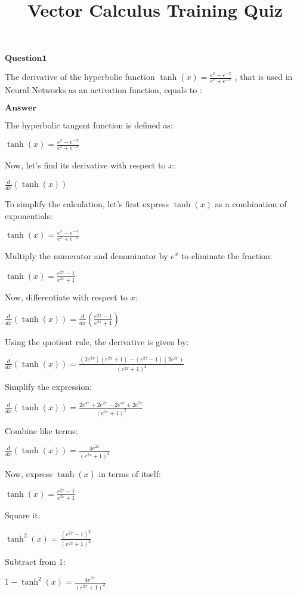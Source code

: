 \documentclass[11pt]{article}
\title{Vector Calculus Training Quiz}
\begin{document}
    
    \maketitle
    
    

    
    $\textbf{Question1}$

The derivative of the hyperbolic function
$\tanh(x) = \frac{e^{x}-e^{-x}}{e^{x}+e^{-x}}$ , that is used in
Neural Networks as an activation function, equals to :

$\textbf{Answer}$

    The hyperbolic tangent function is defined as:

$ \tanh(x) = \frac{e^{x} - e^{-x}}{e^{x} + e^{-x}} $

Now, let's find its derivative with respect to $x$:

$ \frac{d}{dx}(\tanh(x)) $

To simplify the calculation, let's first express $\tanh(x)$ as a
combination of exponentials:

$ \tanh(x) = \frac{e^{x} - e^{-x}}{e^{x} + e^{-x}} $

Multiply the numerator and denominator by $e^x$ to eliminate the
fraction:

$ \tanh(x) = \frac{e^{2x} - 1}{e^{2x} + 1} $

Now, differentiate with respect to $x$:

$ \frac{d}{dx}(\tanh(x)) =
\frac{d}{dx}\left(\frac{e^{2x} - 1}{e^{2x} + 1}\right) $

Using the quotient rule, the derivative is given by:

$ \frac{d}{dx}(\tanh(x)) =
\frac{(2e^{2x})(e^{2x} + 1) - (e^{2x} - 1)(2e^{2x})}{(e^{2x} + 1)^2} $

Simplify the expression:

$ \frac{d}{dx}(\tanh(x)) =
\frac{2e^{4x} + 2e^{2x} - 2e^{4x} + 2e^{2x}}{(e^{2x} + 1)^2} $

Combine like terms:

$ \frac{d}{dx}(\tanh(x)) = \frac{4e^{2x}}{(e^{2x} + 1)^2} $

Now, express $\tanh(x)$ in terms of itself:

$ \tanh(x) = \frac{e^{2x} - 1}{e^{2x} + 1} $

Square it:

$ \tanh^2(x) = \frac{(e^{2x} - 1)^2}{(e^{2x} + 1)^2} $

Subtract from 1:

$ 1 - \tanh^2(x) = \frac{4e^{2x}}{(e^{2x} + 1)^2} $
\end{document}
